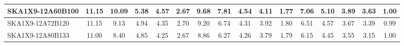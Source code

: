 \begin{table}[H]
{{\begin{tabular}{|lccccc||ccccc||ccccc|}
SKA1X9-12A60B100 & 11.15 \cellcolor{blue!60.00} & 10.09 \cellcolor{red!59.04} & 5.38 \cellcolor{green!41.19} & 4.57 \cellcolor{orange!43.36} & 2.67 \cellcolor{purple!23.60} & 9.68 \cellcolor{blue!60.00} & 7.81 \cellcolor{red!48.44} & 4.54 \cellcolor{green!46.68} & 4.11 \cellcolor{orange!43.36} & 1.77 \cellcolor{purple!18.00} & 7.06 \cellcolor{blue!45.84} & 5.10 \cellcolor{red!43.05} & 3.89 \cellcolor{green!48.38} & 3.63 \cellcolor{orange!48.55} & 1.00 \cellcolor{purple!24.00}\\ \hline 
SKA1X9-12A72B120 & 11.15 \cellcolor{blue!60.00} & 9.13 \cellcolor{red!45.86} & 4.94 \cellcolor{green!21.94} & 4.35 \cellcolor{orange!25.92} & 2.70 \cellcolor{purple!32.00} & 9.20 \cellcolor{blue!51.35} & 6.74 \cellcolor{red!30.24} & 4.31 \cellcolor{green!23.12} & 3.92 \cellcolor{orange!28.30} & 1.80 \cellcolor{purple!29.45} & 6.51 \cellcolor{blue!32.41} & 4.57 \cellcolor{red!22.62} & 3.67 \cellcolor{green!28.72} & 3.39 \cellcolor{orange!33.27} & 0.99 \cellcolor{purple!18.00}\\ \hline 
SKA1X9-12A80B133 & 11.00 \cellcolor{blue!57.51} & 8.40 \cellcolor{red!35.84} & 4.85 \cellcolor{green!18.00} & 4.25 \cellcolor{orange!18.00} & 2.67 \cellcolor{purple!23.60} & 8.86 \cellcolor{blue!45.22} & 6.27 \cellcolor{red!22.25} & 4.26 \cellcolor{green!18.00} & 3.79 \cellcolor{orange!18.00} & 1.79 \cellcolor{purple!25.64} & 6.15 \cellcolor{blue!23.62} & 4.45 \cellcolor{red!18.00} & 3.55 \cellcolor{green!18.00} & 3.15 \cellcolor{orange!18.00} & 1.00 \cellcolor{purple!24.00}\\ \hline 
\end{tabular}}
\vspace{-0.300000cm}
\hspace{1cm} 
}
\end{table}
